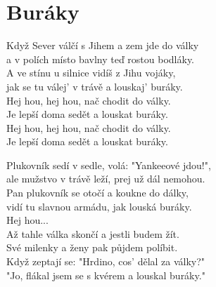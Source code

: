 \section{Buráky}
\onehalfspacing

Když Sever válčí s Jihem a zem jde do války\\
a v polích místo bavlny teď rostou bodláky.\\
A ve stínu u silnice vidíš z Jihu vojáky, \\
jak se tu válej' v trávě a louskaj' buráky.\\

{}Hej hou, hej hou, nač chodit do války. \\
Je lepší doma sedět a louskat buráky.\\
Hej hou, hej hou, nač chodit do války.\\
Je lepší doma sedět a louskat buráky.\\

\begin{multicols}{2}
\singlespacing

\sloka
Plukovník sedí v sedle, volá: "Yankeeové jdou!",\\
ale mužstvo v trávě leží, prej už dál nemohou.\\
Pan plukovník se otočí a koukne do dálky,\\
vidí tu slavnou armádu, jak louská buráky.\\

Hej hou...\\

\sloka
Až tahle válka skončí a jestli budem žít.\\
Své milenky a ženy pak půjdem políbit.\\
Když zeptají se: "Hrdino, cos' dělal za války?"\\
"Jo, flákal jsem se s kvérem a louskal buráky."\\


\end{multicols}